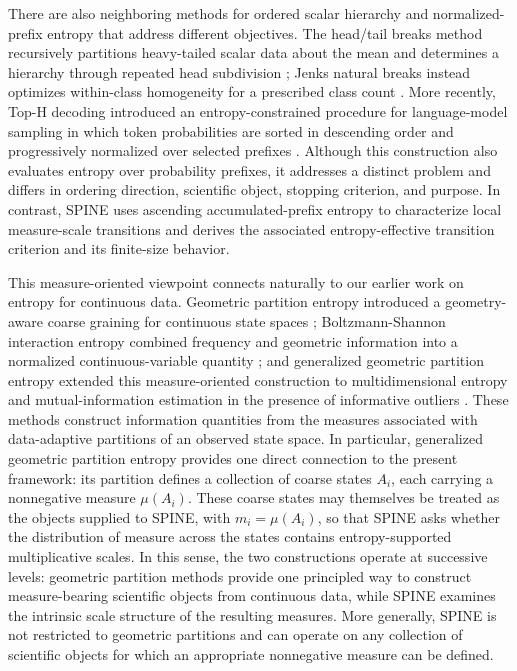 \documentclass[aip,cha,reprint,superscriptaddress,floatfix]{revtex4-2}
\theoremstyle{definition}
\theoremstyle{remark}
\begin{document}
There are also neighboring methods for ordered scalar hierarchy and normalized-prefix entropy that address different objectives. The head/tail breaks method recursively partitions heavy-tailed scalar data about the mean and determines a hierarchy through repeated head subdivision \cite{jiang2013headtail}; Jenks natural breaks instead optimizes within-class homogeneity for a prescribed class count \cite{jenks1967}. More recently, Top-H decoding introduced an entropy-constrained procedure for language-model sampling in which token probabilities are sorted in descending order and progressively normalized over selected prefixes \cite{potraghloou2025toph}. Although this construction also evaluates entropy over probability prefixes, it addresses a distinct problem and differs in ordering direction, scientific object, stopping criterion, and purpose. In contrast, SPINE uses ascending accumulated-prefix entropy to characterize local measure-scale transitions and derives the associated entropy-effective transition criterion and its finite-size behavior.

This measure-oriented viewpoint connects naturally to our earlier work on entropy for continuous data. Geometric partition entropy introduced a geometry-aware coarse graining for continuous state spaces \cite{diggans2022}; Boltzmann-Shannon interaction entropy combined frequency and geometric information into a normalized continuous-variable quantity \cite{diggans2023}; and generalized geometric partition entropy extended this measure-oriented construction to multidimensional entropy and mutual-information estimation in the presence of informative outliers \cite{diggans2025}. These methods construct information quantities from the measures associated with data-adaptive partitions of an observed state space. In particular, generalized geometric partition entropy provides one direct connection to the present framework: its partition defines a collection of coarse states \(A_i\), each carrying a nonnegative measure \(\mu(A_i)\). These coarse states may themselves be treated as the objects supplied to SPINE, with \(m_i=\mu(A_i)\), so that SPINE asks whether the distribution of measure across the states contains entropy-supported multiplicative scales. In this sense, the two constructions operate at successive levels: geometric partition methods provide one principled way to construct measure-bearing scientific objects from continuous data, while SPINE examines the intrinsic scale structure of the resulting measures. More generally, SPINE is not restricted to geometric partitions and can operate on any collection of scientific objects for which an appropriate nonnegative measure can be defined.
\end{document}
